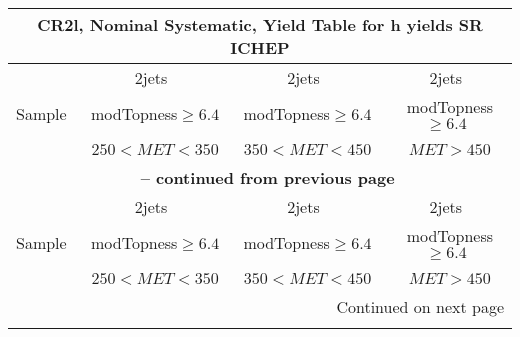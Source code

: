 \documentclass{article}
\begin{document}
 
 
 
 
\pagebreak 

 
 
 
 
\begin{longtable}{|l|c|c|c|} 
 
\multicolumn{4}{c}{ CR2l, Nominal Systematic, Yield Table for h yields SR ICHEP }\\* \hline 
  & 2jets  & 2jets  & 2jets \\* 
Sample  & ~modTopness$\ge6.4$  & ~modTopness$\ge6.4$  & ~modTopness$\ge6.4$ \\* 
  & ~$250<MET<350$  & ~$350<MET<450$  & ~$MET>450$ \\* 
\hline \hline 
\endfirsthead 
 
\multicolumn{4}{c}{{\bfseries \tablename\ \thetable{} -- continued from previous page}}\\* \hline 
  & 2jets  & 2jets  & 2jets \\* 
Sample  & ~modTopness$\ge6.4$  & ~modTopness$\ge6.4$  & ~modTopness$\ge6.4$ \\* 
  & ~$250<MET<350$  & ~$350<MET<450$  & ~$MET>450$ \\* 
\hline \hline 
\endhead 
 
\multicolumn{4}{|r|}{{Continued on next page}}\\* \hline 
\endfoot 
 
 
\endlastfoot 
 

\end{longtable}
\end{document}
